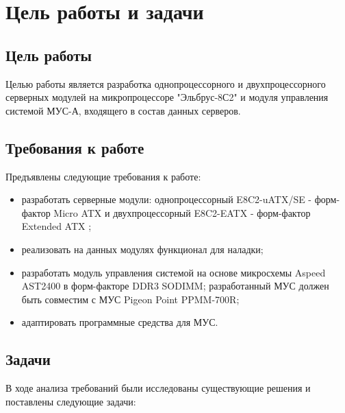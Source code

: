 \section{Цель работы и задачи} \label{literature}

\subsection{Цель работы}

Целью работы является разработка однопроцессорного и двухпроцессорного серверных модулей на микропроцессоре "Эльбрус-8С2" и модуля управления системой МУС-А, входящего в состав данных серверов.

\subsection{Требования к работе}

Предъявлены следующие требования к работе:

\begin{itemize}
	\item разработать серверные модули: однопроцессорный E8C2-uATX/SE - форм-фактор Micro ATX и двухпроцессорный E8C2-EATX - форм-фактор Extended ATX ;
	\item реализовать на данных модулях функционал для наладки;
	\item разработать модуль управления системой на основе микросхемы Aspeed AST2400 в форм-факторе DDR3 SODIMM; разработанный МУС должен быть совместим с МУС Pigeon Point PPMM-700R;
	\item адаптировать программные средства для МУС.
\end{itemize}

\subsection{Задачи}

В ходе анализа требований были исследованы существующие решения и поставлены следующие задачи:

